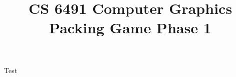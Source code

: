 \documentclass[11pt]{article}
\date{}
\title{CS 6491 Computer Graphics\\
  Packing Game Phase 1}
\begin{document}
\maketitle

Test
\end{document}
